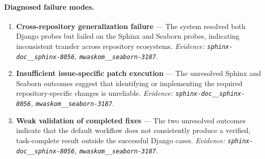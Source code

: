 \paragraph{Diagnosed failure modes.}\begin{enumerate}\itemsep1pt
\item \textbf{Cross-repository generalization failure} --- The system resolved both Django probes but failed on the Sphinx and Seaborn probes, indicating inconsistent transfer across repository ecosystems. \emph{Evidence: \texttt{sphinx-doc\_\_sphinx-8056}, \texttt{mwaskom\_\_seaborn-3187}.}
\item \textbf{Insufficient issue-specific patch execution} --- The unresolved Sphinx and Seaborn outcomes suggest that identifying or implementing the required repository-specific changes is unreliable. \emph{Evidence: \texttt{sphinx-doc\_\_sphinx-8056}, \texttt{mwaskom\_\_seaborn-3187}.}
\item \textbf{Weak validation of completed fixes} --- The two unresolved outcomes indicate that the default workflow does not consistently produce a verified, task-complete result outside the successful Django cases. \emph{Evidence: \texttt{sphinx-doc\_\_sphinx-8056}, \texttt{mwaskom\_\_seaborn-3187}.}
\end{enumerate}
